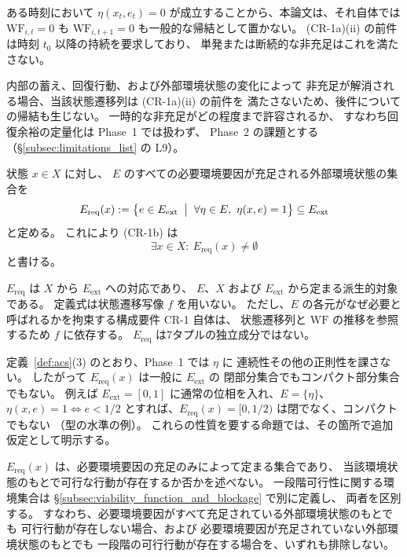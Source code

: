 \begin{remark}[一時的な非充足と持続的な欠損]
\label{rem:cr1_timing}
ある時刻において
$\eta(x_t,e_t)=0$
が成立することから、本論文は、それ自体では
$\mathrm{WF}_{i,t}=0$ も
$\mathrm{WF}_{i,t+1}=0$ も一般的な帰結として置かない。
(CR-1a)(ii) の前件は時刻 $t_0$ 以降の持続を要求しており、
単発または断続的な非充足はこれを満たさない。

内部の蓄え、回復行動、および外部環境状態の変化によって
非充足が解消される場合、当該状態遷移列は (CR-1a)(ii) の前件を
満たさないため、後件についての帰結も生じない。
一時的な非充足がどの程度まで許容されるか、
すなわち回復余裕の定量化は Phase~1 では扱わず、
Phase~2 の課題とする（\S\ref{subsec:limitations_list} の L9）。
\end{remark}

\begin{definition}
\label{def:E_req}
状態 $x\in X$ に対し、
$E$ のすべての必要環境要因が充足される外部環境状態の集合を
\[
  E_{\mathrm{req}}(x)
  :=
  \bigl\{
    e\in E_{\mathrm{ext}}
    \;\bigm|\;
    \forall \eta\in E,\ \eta(x,e)=1
  \bigr\}
  \subseteq
  E_{\mathrm{ext}}
\]
と定める。
これにより (CR-1b) は
\[
  \exists x\in X:\ E_{\mathrm{req}}(x)\neq\emptyset
\]
と書ける。

$E_{\mathrm{req}}$ は $X$ から $E_{\mathrm{ext}}$ への対応であり、
$E$、$X$ および $E_{\mathrm{ext}}$ から定まる派生的対象である。
定義式は状態遷移写像 $f$ を用いない。
ただし、$E$ の各元がなぜ必要と呼ばれるかを拘束する構成要件 CR-1 自体は、
状態遷移列と $\mathrm{WF}$ の推移を参照するため $f$ に依存する。
$E_{\mathrm{req}}$ は7タプルの独立成分ではない。
\end{definition}

\begin{remark}
\label{rem:E_req_properties}
定義~\ref{def:acs}(3) のとおり、Phase~1 では $\eta$ に
連続性その他の正則性を課さない。
したがって $E_{\mathrm{req}}(x)$ は一般に $E_{\mathrm{ext}}$ の
閉部分集合でもコンパクト部分集合でもない。
例えば $E_{\mathrm{ext}}=[0,1]$ に通常の位相を入れ、$E=\{\eta\}$、
$\eta(x,e)=1\iff e<1/2$ とすれば、$E_{\mathrm{req}}(x)=[0,1/2)$ は閉でなく、コンパクトでもない
（型の水準の例）。
これらの性質を要する命題では、その箇所で追加仮定として明示する。

$E_{\mathrm{req}}(x)$ は、必要環境要因の充足のみによって定まる集合であり、
当該環境状態のもとで可行な行動が存在するか否かを述べない。
一段階可行性に関する環境集合は
\S\ref{subsec:viability_function_and_blockage} で別に定義し、
両者を区別する。
すなわち、必要環境要因がすべて充足されている外部環境状態のもとでも
可行行動が存在しない場合、および
必要環境要因が充足されていない外部環境状態のもとでも
一段階の可行行動が存在する場合を、いずれも排除しない。
\end{remark}

